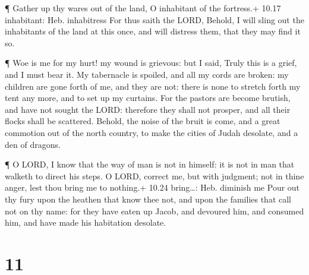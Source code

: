  ¶ Gather up thy wares out of the land, O inhabitant of the
fortress.+ 10.17 inhabitant: Heb. inhabitress  For thus
saith the LORD, Behold, I will sling out the inhabitants of the land at
this once, and will distress them, that they may find it so.

 ¶ Woe is me for my hurt! my wound is grievous: but I said,
Truly this is a grief, and I must bear it.  My tabernacle
is spoiled, and all my cords are broken: my children are gone forth of
me, and they are not: there is none to stretch forth my tent any more,
and to set up my curtains.  For the pastors are become
brutish, and have not sought the LORD: therefore they shall not prosper,
and all their flocks shall be scattered.  Behold, the noise
of the bruit is come, and a great commotion out of the north country, to
make the cities of Judah desolate, and a den of dragons.

 ¶ O LORD, I know that the way of man is not in himself: it
is not in man that walketh to direct his steps.  O LORD,
correct me, but with judgment; not in thine anger, lest thou bring me to
nothing.+ 10.24 bring\ldots: Heb. diminish me  Pour out thy
fury upon the heathen that know thee not, and upon the families that
call not on thy name: for they have eaten up Jacob, and devoured him,
and consumed him, and have made his habitation desolate.

\hypertarget{section-10}{%
\section{11}\label{section-10}}

